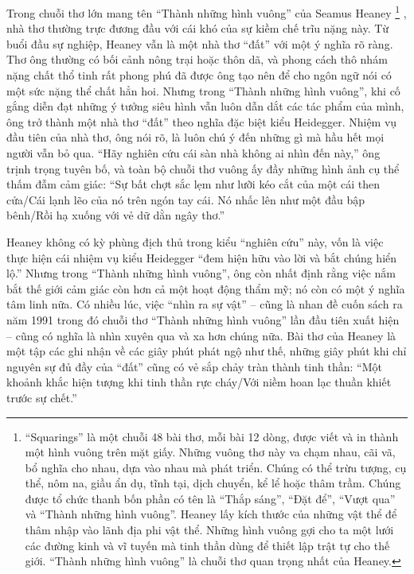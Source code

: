 \documentclass[../main.tex]{subfiles}
\begin{document}
\begin{multicols}{2}
Trong chuỗi thơ lớn mang tên “Thành những hình vuông” của Seamus Heaney \footnote{
“Squarings” là một chuỗi 48 bài thơ, mỗi bài 12 dòng, được viết và in thành một hình vuông trên mặt giấy. Những vuông thơ này va chạm nhau, cãi vã, bổ nghĩa cho nhau, dựa vào nhau mà phát triển. Chúng có thể trừu tượng, cụ thể, nôm na, giầu ẩn dụ, tĩnh tại, dịch chuyển, kể lể hoặc thâm trầm. Chúng được tổ chức thanh bốn phần có tên là “Thắp sáng”, “Đặt để”, “Vượt qua” và “Thành những hình vuông”. Heaney lấy kích thước của những vật thể để thâm nhập vào lãnh địa phi vật thể. Những hình vuông gợi cho ta một lưới các đường kinh và vĩ tuyến mà tinh thần dùng để thiết lập trật tự cho thế giới. “Thành những hình vuông” là chuỗi thơ quan trọng nhất của Heaney.} , nhà thơ thường trực đương đầu với cái khó của sự kiềm chế trĩu nặng này. Từ buổi đầu sự nghiệp, Heaney vẫn là một nhà thơ “đất” với một ý nghĩa rõ ràng. Thơ ông thường có bối cảnh nông trại hoặc thôn dã, và phong cách thô nhám nặng chất thổ tinh rất phong phú đã được ông tạo nên để cho ngôn ngữ nói có một sức nặng thể chất hẳn hoi. Nhưng trong “Thành những hình vuông”, khi cố gắng diễn đạt những ý tưởng siêu hình vẫn luôn dẫn dắt các tác phẩm của mình, ông trở thành một nhà thơ “đất” theo nghĩa đặc biệt kiểu Heidegger. Nhiệm vụ đầu tiên của nhà thơ, ông nói rõ, là luôn chú ý đến những gì mà hầu hết mọi người vẫn bỏ qua. “Hãy nghiên cứu cái sàn nhà không ai nhìn đến này,” ông trịnh trọng tuyên bố, và toàn bộ chuỗi thơ vuông ấy đầy những hình ảnh cụ thể thấm đẫm cảm giác: “Sự bất chợt sắc lẹm như lưỡi kéo cắt của một cái then cửa/Cái lạnh lẽo của nó trên ngón tay cái. Nó nhấc lên như một đầu bập bênh/Rồi hạ xuống với vẻ dữ dằn ngây thơ.” 

Heaney không có kỳ phùng địch thủ trong kiểu “nghiên cứu” này, vốn là việc thực hiện cái nhiệm vụ kiểu Heidegger “đem hiện hữu vào lời và bắt chúng hiển lộ.” Nhưng trong “Thành những hình vuông”, ông còn nhất định rằng việc nắm bắt thế giới cảm giác còn hơn cả một hoạt động thẩm mỹ; nó còn có một ý nghĩa tâm linh nữa. Có nhiều lúc, việc “nhìn ra sự vật” – cũng là nhan đề cuốn sách ra năm 1991 trong đó chuỗi thơ “Thành những hình vuông” lần đầu tiên xuất hiện – cũng có nghĩa là nhìn xuyên qua và xa hơn chúng nữa. Bài thơ của Heaney là một tập các ghi nhận về các giây phút phát ngộ như thế, những giây phút khi chỉ nguyên sự đủ đầy của “đất” cũng có vẻ sắp chảy tràn thành tinh thần: “Một khoảnh khắc hiện tượng khi tinh thần rực cháy/Với niềm hoan lạc thuần khiết trước sự chết.” 


\end{multicols}
\end{document}
